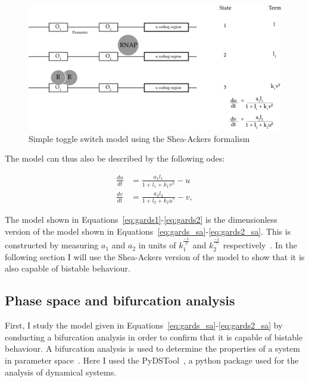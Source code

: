 \begin{figure}[tb]
\centerfloat
\includegraphics[scale=0.7]{../../chapters/chapterABCSysBio/images/shea-ackers-cs.png}
\caption[Simple toggle switch model using the Shea-Ackers formalism]{\label{fig:sa-GCS}Simple toggle switch model using the Shea-Ackers formalism}
\end{figure}


\noindent The model can thus also be described by the following \acrshort{ode}s:

\begin{align}\label{eq:gards_sa}
\frac{du}{dt} &= \frac{a_1  l_1}{1 + l_1 + k_1  v^{\beta}} - u \\\label{eq:gards2_sa}
\frac{dv}{dt} &= \frac{a_2  l_2}{1 + l_2 + k_2  u^{\gamma }} - v,
\end{align}

The model shown in Equations~\ref{eq:gards1}-\ref{eq:gards2} is the dimensionless version of the model shown in Equations~\ref{eq:gards_sa}-\ref{eq:gards2_sa}. This is constructed by measuring $a_1$ and $a_2$ in units of $k_{1}^{\frac{-1}{β}}$ and $k_{2}^{\frac{-1}{γ}}$ respectively~\autocite{phys_biol_cell}. In the following section I will use the Shea-Ackers version of the model to show that it is also capable of bistable behaviour. 

\subsection{Phase space and bifurcation analysis}
\label{sec:bifurc}


First, I study the model given in Equations~\ref{eq:gards_sa}-\ref{eq:gards2_sa} by conducting a bifurcation analysis in order to confirm that it is capable of bistable behaviour. A bifurcation analysis is used to determine the properties of a system in parameter space~\autocite{Alon:2007}. Here I used the PyDSTool~\autocite{Clewley:2012kj}, a python package used for the analysis of dynamical systems. 


